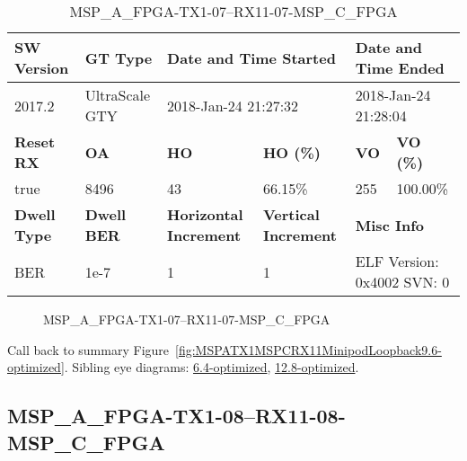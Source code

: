 \begin{table}[h]
\centering
\caption{MSP\_A\_FPGA-TX1-07--RX11-07-MSP\_C\_FPGA}
\label{tab:MSPAFPGATX107RX1107MSPCFPGA9.6-optimized}
\begin{tabular}{@{}|l|l|l|l|l|l|@{}}
\toprule
\textbf{SW Version}                & \textbf{GT Type}   & \multicolumn{2}{l|}{\textbf{Date and Time Started}}            & \multicolumn{2}{l|}{\textbf{Date and Time Ended}}        \\ \midrule
2017.2                       & UltraScale GTY          & \multicolumn{2}{l|}{2018-Jan-24 21:27:32}                   & \multicolumn{2}{l|}{2018-Jan-24 21:28:04}               \\ \midrule
\textbf{Reset RX}                  & \textbf{OA} & \textbf{HO}   & \textbf{HO (\%)} & \textbf{VO} & \textbf{VO (\%)} \\ \midrule
true & 8496        & 43          & 66.15\%        & 255        & 100.00\%       \\ \midrule
\textbf{Dwell Type}                & \textbf{Dwell BER} & \textbf{Horizontal Increment} & \textbf{Vertical Increment}    & \multicolumn{2}{l|}{\textbf{Misc Info}}                  \\ \midrule
BER                            & 1e-7        & 1        & 1           & \multicolumn{2}{l|}{ELF Version: 0x4002 SVN: 0}                         \\ \bottomrule
\end{tabular}
\end{table}

\begin{figure}[h]
\caption{MSP\_A\_FPGA-TX1-07--RX11-07-MSP\_C\_FPGA} \label{fig:MSPAFPGATX107RX1107MSPCFPGA9.6-optimized}
\end{figure}

Call back to summary Figure~\ref{fig:MSPATX1MSPCRX11MinipodLoopback9.6-optimized}.
Sibling eye diagrams: \hyperref[sec:MSPAFPGATX107RX1107MSPCFPGA6.4-optimized]{6.4-optimized}, \hyperref[sec:MSPAFPGATX107RX1107MSPCFPGA12.8-optimized]{12.8-optimized}.

\clearpage
\newpage


\subsection{MSP\_A\_FPGA-TX1-08--RX11-08-MSP\_C\_FPGA}\label{sec:MSPAFPGATX108RX1108MSPCFPGA9.6-optimized}

